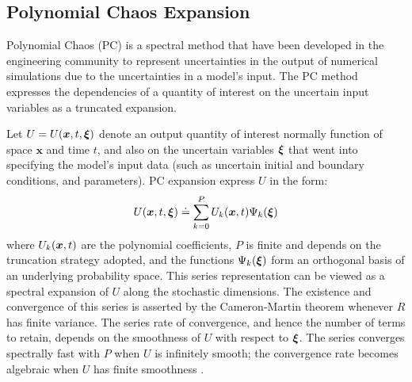 \subsection{Polynomial Chaos Expansion}
\label{sec:uqpce}

Polynomial Chaos (PC) is a spectral method that have been developed in the engineering community to represent uncertainties in the output of numerical simulations \citep{Villegas2012,Lin2009,Xiu2004}
due to the uncertainties in a model's input.
The PC method expresses the dependencies of a quantity of 
interest on the uncertain input variables as a truncated expansion. 

Let $U=U(\bm{x},t,\xxi)$ 
denote an output quantity of 
interest normally function of space $\bm{x}$ and time $t$, and also on the uncertain variables $\xxi$ that went into
specifying the model's input data (such as uncertain initial and boundary conditions, and parameters). PC expansion express $U$ in the form:
\begin{equation}
  U(\xbold,t,\xxi) \doteq \sum_{k = 0}^P U_k(\xbold,t) \Psi_k(\xxi)
\label{eq:stochseries}
\end{equation}
where $U_k(\xbold,t)$ are the polynomial coefficients, $P$ is finite
and depends on the truncation strategy adopted, and the functions
$\Psi_k(\xxi)$ form an orthogonal basis of an underlying probability
space. This series representation can be viewed as a spectral expansion
of $U$ along the stochastic dimensions.  The existence and convergence of this series
is asserted by the Cameron-Martin theorem
\citep{Cameron:1947}  whenever $R$ has finite variance. The series rate of convergence, and
hence the number of terms to retain, depends on the smoothness of
$U$ with respect to $\xxi$. The series converges spectrally fast with $P$
when $U$ is infinitely smooth; the convergence rate becomes algebraic
when $U$ has finite smoothness \citep{Canuto:2006}. 

